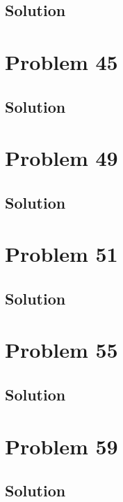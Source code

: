 \documentclass[12pt]{article}
\begin{document}
        \subsection{Solution}

    \pagebreak
    \section{Problem 45}

        \subsection{Solution}

    \pagebreak
    \section{Problem 49}

        \subsection{Solution}

    \pagebreak
    \section{Problem 51}

        \subsection{Solution}

    \pagebreak
    \section{Problem 55}

        \subsection{Solution}

    \pagebreak
    \section{Problem 59}

        \subsection{Solution}

    \pagebreak
\end{document}
